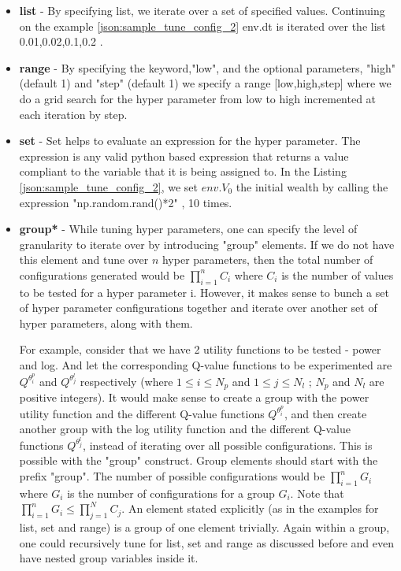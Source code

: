  \begin{itemize}
     \item \textbf{list} - By specifying list, we iterate over a set of specified values. Continuing on the example \ref{json:sample_tune_config_2} env.dt is iterated over the list { 0.01,0.02,0.1,0.2 }.
    \item \textbf{range} - By specifying the keyword,"low", and the optional parameters, "high" (default 1) and "step" (default 1) we specify a range [low,high,step] where we do a grid search for the hyper parameter from low to high incremented at each iteration by step.
    \item \textbf{set} - Set helps to evaluate an expression for the hyper parameter. The expression is any valid python based expression that returns a value compliant to the variable that it is being assigned to. In the Listing \ref{json:sample_tune_config_2}, we set $env.V_0$ the initial wealth by calling the expression "np.random.rand()*2" , 10 times.
    \item \textbf{group*} - While tuning hyper parameters, one can specify the level of granularity to iterate over by introducing "group" elements. If we do not have this element and tune over $n$ hyper parameters, then the total number of configurations generated would be $\prod_{i=1}^n C_i$ where $C_i$ is the number of values to be tested for a hyper parameter i. However, it makes sense to bunch a set of hyper parameter configurations together and iterate over another set of hyper parameters, along with them.
    
    For example, consider that we have 2 utility functions to be tested - power and log. And let the corresponding Q-value functions to be experimented are $Q^{\theta^p_i}$ and $Q^{\theta^l_j}$ respectively (where $1 \leq i \leq N_p$ and $1 \leq j \leq N_l$ ; $N_p$ and $N_l$ are positive integers). It would make sense to create a group with the power utility function and the different Q-value functions $Q^{\theta^p_i}$, and then create another group with the log utility function and  the different Q-value functions $Q^{\theta^l_j}$, instead of iterating over all possible configurations. This is possible with the "group" construct. Group elements should start with the prefix "group".
    The number of possible configurations would be $\prod_{i=1}^n G_i$ where $G_i$ is the number of configurations for a group $G_i$.  Note that  $\prod_{i=1}^n G_i \leq \prod_{j=1}^N C_j$. An element stated explicitly (as in the  examples for list, set and range)  is a group of one element trivially.
    Again within a group, one could recursively tune for list, set and range as discussed before and even have nested group variables inside it.
\end{itemize}



 